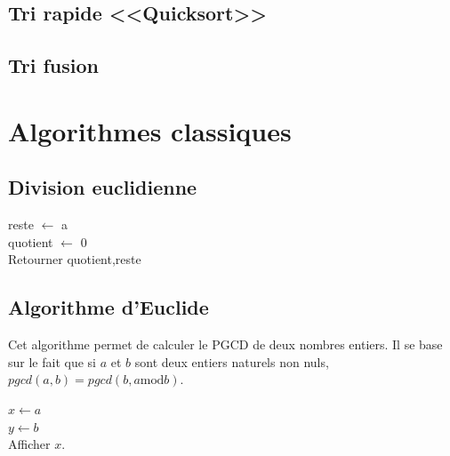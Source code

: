 \documentclass[10pt]{article}
\begin{document}
\subsection{Tri rapide <<Quicksort>>}
\subsection{Tri fusion}

\section{Algorithmes classiques}
\subsection{Division euclidienne}
\begin{pseudo}
\begin{algorithm}[H]
reste $\gets$ a\\
quotient $\gets$ 0\\
Retourner quotient,reste
\end{algorithm}
\end{pseudo}

\subsection{Algorithme d'Euclide}
Cet algorithme permet de calculer le PGCD de deux nombres entiers. Il se base sur le fait que si $a$ et $b$ sont deux entiers naturels non nuls, $pgcd(a,b)=pgcd(b, a \text{mod} b)$. 

\begin{pseudo}
\begin{algorithm}[H]
$x\gets a$\\
$y\gets b$\\
Afficher $x$.
\end{algorithm}
\end{pseudo}
\end{document}
